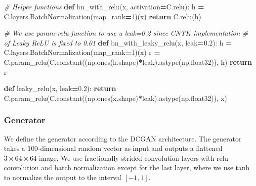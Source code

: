 \documentclass[]{book}
\newenvironment{Shaded}{\begin{snugshade}}{\end{snugshade}}
\newcommand{\KeywordTok}[1]{\textcolor[rgb]{0.13,0.29,0.53}{\textbf{#1}}}
\newcommand{\DecValTok}[1]{\textcolor[rgb]{0.00,0.00,0.81}{#1}}
\newcommand{\FloatTok}[1]{\textcolor[rgb]{0.00,0.00,0.81}{#1}}
\newcommand{\CommentTok}[1]{\textcolor[rgb]{0.56,0.35,0.01}{\textit{#1}}}
\newcommand{\ControlFlowTok}[1]{\textcolor[rgb]{0.13,0.29,0.53}{\textbf{#1}}}
\newcommand{\OperatorTok}[1]{\textcolor[rgb]{0.81,0.36,0.00}{\textbf{#1}}}
\newcommand{\NormalTok}[1]{#1}
\theoremstyle{definition}
\theoremstyle{definition}
\theoremstyle{definition}
\theoremstyle{remark}
\begin{document}
\begin{Shaded}
\begin{Highlighting}[]
\CommentTok{# Helper functions}
\KeywordTok{def}\NormalTok{ bn_with_relu(x, activation}\OperatorTok{=}\NormalTok{C.relu):}
\NormalTok{    h }\OperatorTok{=}\NormalTok{ C.layers.BatchNormalization(map_rank}\OperatorTok{=}\DecValTok{1}\NormalTok{)(x)}
    \ControlFlowTok{return}\NormalTok{ C.relu(h)}

\CommentTok{# We use param-relu function to use a leak=0.2 since CNTK implementation }
\CommentTok{# of Leaky ReLU is fixed to 0.01}
\KeywordTok{def}\NormalTok{ bn_with_leaky_relu(x, leak}\OperatorTok{=}\FloatTok{0.2}\NormalTok{):}
\NormalTok{    h }\OperatorTok{=}\NormalTok{ C.layers.BatchNormalization(map_rank}\OperatorTok{=}\DecValTok{1}\NormalTok{)(x)}
\NormalTok{    r }\OperatorTok{=}\NormalTok{ C.param_relu(C.constant((np.ones(h.shape)}\OperatorTok{*}\NormalTok{leak).astype(np.float32)), h)}
    \ControlFlowTok{return}\NormalTok{ r}

\KeywordTok{def}\NormalTok{ leaky_relu(x, leak}\OperatorTok{=}\FloatTok{0.2}\NormalTok{):}
    \ControlFlowTok{return}\NormalTok{ C.param_relu(C.constant((np.ones(x.shape)}\OperatorTok{*}\NormalTok{leak).astype(np.float32)), x)}
\end{Highlighting}
\end{Shaded}

\subsubsection{Generator}\label{generator}

We define the generator according to the DCGAN architecture. The
generator takes a 100-dimensional random vector as input and outputs a
flattened \(3\times64\times64\) image. We use fractionally strided
convolution layers with relu convolution and batch normalization except
for the last layer, where we use tanh to normalize the output to the
interval \([-1, 1]\).
\end{document}
